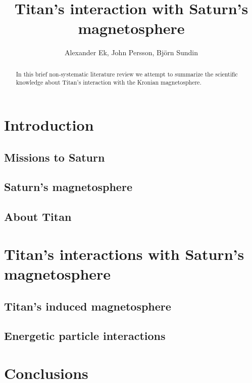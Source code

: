 \documentclass[12pt, parskip=full*, abstract]{scrartcl}
\title{Titan's interaction with Saturn's magnetosphere}
\author{Alexander Ek, John Persson, Björn Sundin}
\begin{document}
\maketitle
\vspace{5mm}
\begin{abstract}
	In this brief non-systematic literature review we attempt to summarize the scientific knowledge about Titan's interaction with the Kronian magnetosphere.
\end{abstract}

\tableofcontents
\newpage

\section{Introduction}
\subsection{Missions to Saturn}

\subsection{Saturn's magnetosphere}

\subsection{About Titan}


\section{Titan's interactions with Saturn's magnetosphere}

\subsection{Titan's induced magnetosphere}


\subsection{Energetic particle interactions}


\parencite{solar-system-magnetospheres}
\parencite{encyclopedia}

 

\section{Conclusions}

\newpage
\printbibliography
\end{document}
